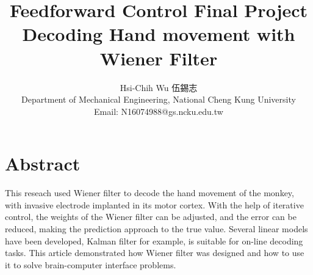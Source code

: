 \documentclass[8pt,a4paper]{article}
\begin{document}
\title{ \bf{ Feedforward Control Final Project \\  Decoding Hand movement with Wiener Filter }}
\author{ Hsi-Chih Wu 伍錫志 \\ Department of Mechanical Engineering, National Cheng Kung University \\ Email: N16074988@gs.ncku.edu.tw  }
\date{}

\maketitle

\section*{Abstract}

This reseach used Wiener filter to decode the hand movement of the monkey, with invasive electrode implanted in its motor cortex. 
With the help of iterative control, the weights of the Wiener filter can be adjusted, and the error can be reduced, making the prediction approach to the true value. 
Several linear models have been developed, Kalman filter for example, is suitable for on-line decoding tasks. This article demonstrated how Wiener filter was designed and how to use it to solve brain-computer interface problems.
\end{document}
